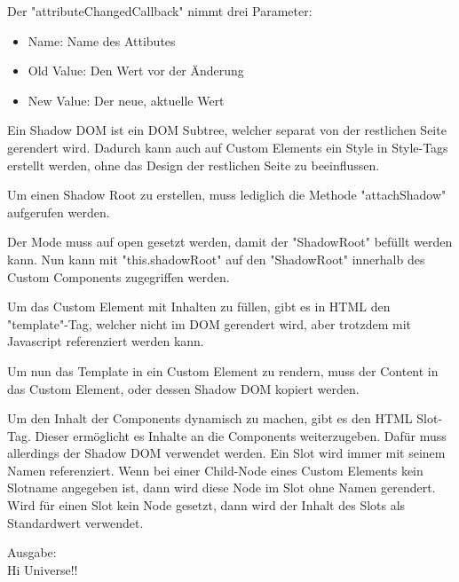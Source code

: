 Der "attributeChangedCallback" nimmt drei Parameter:
\begin{itemize}
    \item 	Name: Name des Attibutes
    \item 	Old Value: Den Wert vor der Änderung
    \item 	New Value: Der neue, aktuelle Wert 
\end{itemize}



Ein Shadow DOM ist ein DOM Subtree, welcher separat von der restlichen Seite gerendert wird. Dadurch kann auch auf Custom Elements ein Style in Style-Tags erstellt werden, ohne das Design der restlichen Seite zu beeinflussen.

Um einen Shadow Root zu erstellen, muss lediglich die Methode "attachShadow" aufgerufen werden. 


Der Mode muss auf open gesetzt werden, damit der "ShadowRoot" befüllt werden kann. Nun kann mit "this.shadowRoot" auf den "ShadowRoot" innerhalb des Custom Components zugegriffen werden.
\cite{MDNShadowRoot}


Um das Custom Element mit Inhalten zu füllen, gibt es in HTML den "template"-Tag, welcher nicht im DOM gerendert wird, aber trotzdem mit Javascript referenziert werden kann. 


Um nun das Template in ein Custom Element zu rendern, muss der Content in das Custom Element, oder dessen Shadow DOM kopiert werden.



Um den Inhalt der Components dynamisch zu machen, gibt es den HTML Slot-Tag. Dieser ermöglicht es Inhalte an die Components weiterzugeben. Dafür muss allerdings der Shadow DOM verwendet werden. Ein Slot wird immer mit seinem Namen referenziert. Wenn bei einer Child-Node eines Custom Elements kein Slotname angegeben ist, dann wird diese Node im Slot ohne Namen gerendert. Wird für einen Slot kein Node gesetzt, dann wird der Inhalt des Slots als Standardwert verwendet. 
\cite{MDNSlots}




Ausgabe: \\
Hi Universe!!